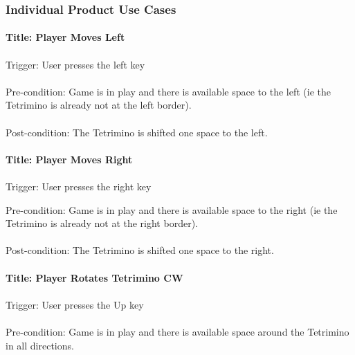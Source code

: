 \documentclass[12pt, titlepage]{article}
\begin{document}
\subsubsection{Individual Product Use Cases}

\paragraph{Title: Player Moves Left}
\paragraph{}
Trigger: User presses the left key
\paragraph{}
Pre-condition: Game is in play and there is available space to the left (ie the Tetrimino is already not at the left border).
\paragraph{}
Post-condition: The Tetrimino is shifted one space to the left.

\paragraph{Title: Player Moves Right}
\paragraph{}
Trigger: User presses the right key

Pre-condition: Game is in play and there is available space to the right (ie the Tetrimino is already not at the right border).
\paragraph{}
Post-condition: The Tetrimino is shifted one space to the right.

\paragraph{Title: Player Rotates Tetrimino CW}
\paragraph{}
Trigger: User presses the Up key
\paragraph{}
Pre-condition: Game is in play and there is available space around the Tetrimino in all directions.
\end{document}
